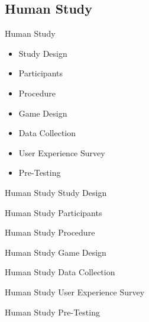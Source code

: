 \subsection*{Human Study}
\begin{frame}{Human Study}
    \begin{itemize}
        \item Study Design
        \item Participants
        \item Procedure
        \item Game Design
        \item Data Collection
        \item User Experience Survey
        \item Pre-Testing
    \end{itemize}
\end{frame}
\begin{frame}{Human Study \textemdash{} Study Design}
    
\end{frame}
\begin{frame}{Human Study \textemdash{} Participants}

\end{frame}
\begin{frame}{Human Study \textemdash{} Procedure}

\end{frame}
\begin{frame}{Human Study \textemdash{} Game Design}

\end{frame}
\begin{frame}{Human Study \textemdash{} Data Collection}

\end{frame}
\begin{frame}{Human Study \textemdash{} User Experience Survey}

\end{frame}
\begin{frame}{Human Study \textemdash{} Pre-Testing}

\end{frame}

